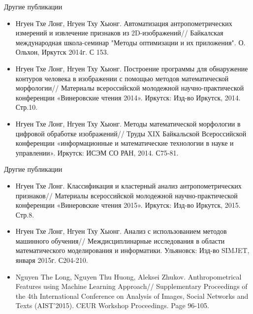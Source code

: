 \documentclass[10pt,pdf,hyperref={unicode},xcolor=table]{beamer}
\begin{document}
		\begin{frame}{Другие публикации}
		\begin{itemize}
  \item Нгуен Тхе Лонг, Нгуен Тху Хыонг. Автоматизация антропометрических измерений и извлечение признаков из 2D-изображений// Байкалская международная школа-семинар "Методы оптимизации и их приложения". О. Ольхон, Иркутск 2014г. С 153.
	\item Нгуен Тхе Лонг, Нгуен Тху Хыонг. Построение программы для обнаружение контуров человека в изображении с помощью методов математической морфологии// Материалы всероссийской молодежной научно-практической конференции «Винеровские чтения 2014». Иркутск: Изд-во Иркутск, 2014. Стр.10.
	\item Нгуен Тхе Лонг, Нгуен Тху Хыонг. Методы математической морфологии в цифровой обработке изображений// Труды XIX Байкальской Всероссийской конференции «информационные и математические технологии в науке и управлении». Иркутск: ИСЭМ СО РАН, 2014. С75-81.
		\end{itemize}
		\end{frame}
		\begin{frame}{Другие публикации}
		\begin{itemize}
	\item Нгуен Тхе Лонг. Классификация и кластерный анализ антропометрических признаков// Материалы всероссийской молодежной научно-практической конференции «Винеровские чтения 2015». Иркутск: Изд-во Иркутск, 2015. Стр.8.
	\item Нгуен Тхе Лонг, Нгуен Тху Хыонг. Анализ с использованием методов машинного обучения// Междисциплинарные исследования в области математического моделирования и информатики. Ульяновск: Изд-во SIMJET, января 2015г. С204-210.
	\item Nguyen The Long, Nguyen Thu Huong, Aleksei Zhukov. Anthropometrical Features using Machine Learning Approach// Supplementary Proceedings of the 4th International Conference on Analysis of Images, Social Networks and Texts (AIST'2015). CEUR Workshop Proceedings. Page 96-105.
	 	\end{itemize}
\end{frame}
\end{document}
